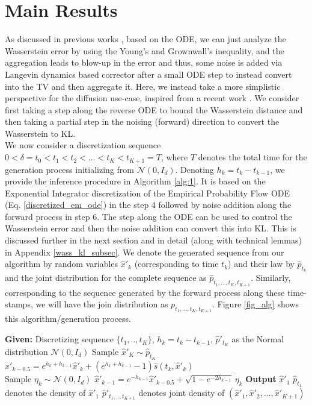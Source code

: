 \documentclass{article}
\begin{document}
\section{Main Results}
\noindent
{As discussed in previous works \cite{chen2023probability}, based on the ODE, we can just analyze the Wasserstein error by using the Young's and Grownwall's inequality, and the aggregation leads to blow-up in the error and thus, some noise is added  via Langevin dynamics based corrector after a small ODE step to instead convert into the TV and then aggregate it. Here, we instead take a more simplistic perspective for the diffusion use-case, inspired from a recent work \cite{jain2025multi}. We consider first taking a step along the reverse ODE to bound the Wasserstein distance and then taking a partial step in the noising (forward) direction to convert the Wasserstein to KL. \\
\noindent
We now consider a discretization sequence $0<\delta=t_0<t_1< t_2 <...<t_K<t_{K+1}=T$, where  $T$ denotes the total time for the generation process initializing from $\mathcal{N}(0,I_d)$. Denoting $h_{k} = t_{k}-t_{k-1}$, we provide the inference procedure in Algorithm \ref{alg:1}. It is based on the Exponential Integrator discretization of the Empirical Probability Flow ODE (Eq. \ref{discretized_em_ode}) in the step 4 followed by noise addition along the forward process in step 6. The step along the ODE can be used to control the Wasserstein error \cite{chen2023probability} and then the noise addition can convert this into KL. This is discussed further in the next section and in detail (along with technical lemmas) in Appendix \ref{wass_kl_subsec}. We denote the generated sequence from our algorithm by random variables $\hat{x}'_k$ (corresponding to time $t_k$) and their law  by $\hat{p}_{t_k}$ and the joint distribution for the complete sequence as $\hat{p}_{t_1,...,t_K, t_{K+1}}$. Similarly, corresponding to the sequence generated by the forward process along these time-stamps, we will have the join distribution as ${p}_{t_1,...,t_K,t_{K+1}}$.
Figure \ref{fig_alg} shows this algorithm/generation process. }
\noindent
\begin{algorithm}[H]
\caption{Inference Algorithm For Diffusion Models}
\label{alg:1}
\begin{algorithmic}[1]
\STATE \textbf{Given:} Discretizing sequence $\{t_1,..,t_K\}$, $h_k=t_k-t_{k-1}$, $\hat{p}'_{t_K}$ as the Normal distribution $\mathcal{N}(0,I_d)$
\STATE Sample $\hat{x}'_K \sim \hat{p}_{t_K}$
    \STATE $\hat{x}'_{k-0.5} =  e^{ h_k +h_{k-1}} \hat{x}'_{k} +
 (e^{h_k+h_{k-1}}-1) 
 \hat{s}(t_{k},\hat{x}'_{{k}})$ \\
    \STATE Sample $\eta_k \sim \mathcal{N}(0, I_d)$
    \STATE $\hat{x}'_{k-1} = e^{-h_{k-1}} \hat{x}'_{k-0.5} + \sqrt{1 - e^{-2h_{k-1}}}\, \eta_k$ 
\ENDFOR
\STATE \textbf{Output} $\hat{x}'_1$
\STATE $\hat{p}_{t_1}$ denotes the density of $\hat{x}'_1$
\STATE $\hat{p}'_{t_1,.., t_{K+1}}$ denotes joint density of $(\hat{x}'_1, \hat{x}'_2, \ldots, \hat{x}'_{K+1})$
\end{algorithmic}
\end{algorithm}
\end{document}
